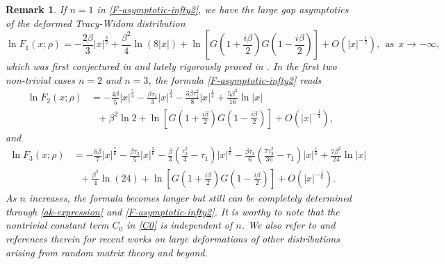\documentclass[11pt,a4paper]{article}
\newtheorem{rem}[thm]{Remark}
\numberwithin{equation}{section}
\begin{document}
\begin{rem}
If $n=1$ in \eqref{F-asymptotic-infty2}, we have the large gap asymptotics of the deformed Tracy-Widom distribution
\begin{equation*}
\ln{F}_1(x;\rho)=-\frac{2\beta}{3}|x|^{\frac{3}{2}}+\frac{\beta^2}{4}\ln(8|x|)+
\ln\left[G\left(1+\frac{i\beta}{2}\right)
G\left(1-\frac{i\beta}{2}\right)\right]+O\left(|x|^{-\frac{1}{2}}\right),~~\mathrm{as}~~x\to-\infty,
\end{equation*}
which was first conjectured in
\cite[Conjecture 3]{BCI2016} and lately rigorously proved in \cite{BB2018,BIP2019}.
In the first two non-trivial cases $n=2$ and $n=3$, the formula \eqref{F-asymptotic-infty2} reads
\begin{align*}
\ln{F}_2(x;\rho)&=-\frac{4\beta}{5}|x|^{\frac{5}{4}}-\frac{\beta\tau_1}{3}|x|^{\frac{3}{4}}
-\frac{3\beta\tau_1^2}{8}|x|^{\frac{1}{4}}+\frac{5\beta^2}{16}\ln|x|\nonumber\\
&~~~+\beta^2\ln{2}+\ln\left[G\left(1+\frac{i\beta}{2}\right)
G\left(1-\frac{i\beta}{2}\right)\right]+O\left(|x|^{-\frac{1}{4}}\right),
\end{align*}
and
\begin{align*}
\ln{F}_3(x;\rho)&=-\frac{6\beta}{7}|x|^{\frac{7}{6}}-\frac{\beta\tau_2}{5}|x|^{\frac{5}{6}}
-\frac{\beta}{3}\left(\frac{\tau_2^2}{4}-\tau_1\right)|x|^{\frac{3}{6}}
-\frac{\beta\tau_2}{6}\left(\frac{7\tau_2^2}{36}-\tau_1\right)|x|^{\frac{1}{6}}
+\frac{7\beta^2}{24}\ln|x|\nonumber\\
&~~~+\frac{\beta^2}{4}\ln(24)+\ln\left[G\left(1+\frac{i\beta}{2}\right)
G\left(1-\frac{i\beta}{2}\right)\right]+O\left(|x|^{-\frac{1}{6}}\right).
\end{align*}
As $n$ increases, the formula becomes longer but still can be completely determined through \eqref{ak-expression} and \eqref{F-asymptotic-infty2}. It is worthy to note that the nontrivial constant term $C_0$ in \eqref{C0} is independent of $n$. We also refer to \cite{BDIK2015,BIP2019,Charlier21,CC2021,DXZ22a,DXZ22b,DZ22} and references therein for recent works on large deformations of other distributions arising from random matrix theory and beyond.
\end{rem}
\end{document}

